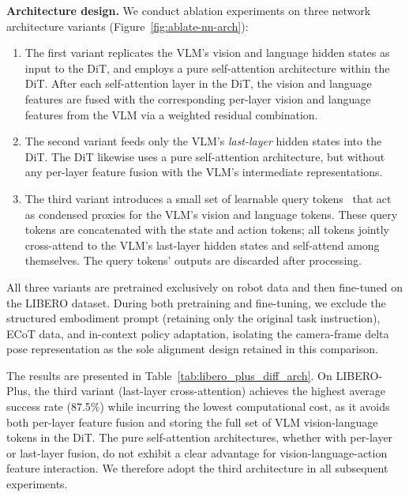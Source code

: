 \textbf{Architecture design. }
We conduct ablation experiments on three network architecture variants (Figure~\ref{fig:ablate-nn-arch}):
\begin{enumerate}[leftmargin=*,topsep=2pt,itemsep=1pt]
    \item The first variant replicates the VLM's vision and language hidden states as input to the DiT, and employs a pure self-attention architecture within the DiT. After each self-attention layer in the DiT, the vision and language features are fused with the corresponding per-layer vision and language features from the VLM via a weighted residual combination.
    \item The second variant feeds only the VLM's \emph{last-layer} hidden states into the DiT. The DiT likewise uses a pure self-attention architecture, but without any per-layer feature fusion with the VLM's intermediate representations.
    \item The third variant introduces a small set of learnable query tokens~\citep{ICLR2024Registers} that act as condensed proxies for the VLM's vision and language tokens. 
    These query tokens are concatenated with the state and action tokens; all tokens jointly cross-attend to the VLM's last-layer hidden states and self-attend among themselves. The query tokens' outputs are discarded after processing.
\end{enumerate}

All three variants are pretrained exclusively on robot data and then fine-tuned on the LIBERO dataset. During both pretraining and fine-tuning, we exclude the structured embodiment prompt (retaining only the original task instruction), ECoT data, and in-context policy adaptation, isolating the camera-frame delta pose representation as the sole alignment design retained in this comparison.


The results are presented in Table~\ref{tab:libero_plus_diff_arch}. On LIBERO-Plus, the third variant (last-layer cross-attention) achieves the highest average success rate (87.5\%) while incurring the lowest computational cost, as it avoids both per-layer feature fusion and storing the full set of VLM vision-language tokens in the DiT. The pure self-attention architectures, whether with per-layer or last-layer fusion, do not exhibit a clear advantage for vision-language-action feature interaction. We therefore adopt the third architecture in all subsequent experiments.

